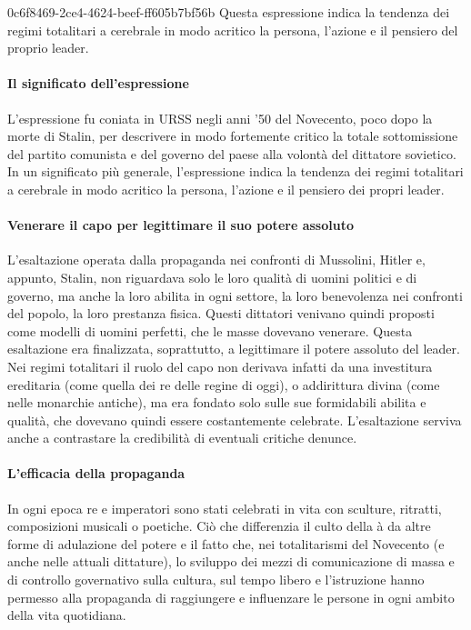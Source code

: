\documentclass[preview]{standalone}
\begin{document}
\begin{snippet}{0c6f8469-2ce4-4624-beef-ff605b7bf56b}
    Questa espressione indica la tendenza dei regimi totalitari
    a cerebrale in modo acritico la persona, l'azione e il pensiero del proprio leader.

    \paragraph*{Il significato dell'espressione}
    L'espressione  fu coniata in URSS negli anni '50 del Novecento, poco
    dopo la morte di Stalin, per descrivere in modo fortemente critico la totale sottomissione del
    partito comunista e del governo del paese alla volontà del dittatore sovietico. In un significato
    più generale, l'espressione indica la tendenza dei regimi totalitari a cerebrale in modo acritico
    la persona, l'azione e il pensiero dei propri leader.

    \paragraph*{Venerare il capo per legittimare il suo potere assoluto}
    L'esaltazione operata dalla propaganda nei confronti di Mussolini, Hitler e, appunto, Stalin, non
    riguardava solo le loro qualità di uomini politici e di governo, ma anche la loro abilita in ogni
    settore, la loro benevolenza nei confronti del popolo, la loro prestanza fisica. Questi dittatori
    venivano quindi proposti come modelli di uomini perfetti, che le masse dovevano venerare.
    Questa esaltazione era finalizzata, soprattutto, a legittimare il potere assoluto del leader. Nei
    regimi totalitari il ruolo del capo non derivava infatti da una investitura ereditaria (come quella
    dei re delle regine di oggi), o addirittura divina (come nelle monarchie antiche), ma era fondato
    solo sulle sue formidabili abilita e qualità, che dovevano quindi essere costantemente celebrate.
    L'esaltazione serviva anche a contrastare la credibilità di eventuali critiche denunce.

    \paragraph*{L'efficacia della propaganda}
    In ogni epoca re e imperatori sono stati celebrati in vita con sculture, ritratti, composizioni
    musicali o poetiche. Ciò che differenzia il culto della à da altre forme di adulazione
    del potere e il fatto che, nei totalitarismi del Novecento (e anche nelle attuali dittature), lo
    sviluppo dei mezzi di comunicazione di massa e di controllo governativo sulla cultura, sul tempo
    libero e l'istruzione hanno permesso alla propaganda di raggiungere e influenzare le persone
    in ogni ambito della vita quotidiana.
\end{snippet}

\end{document}
